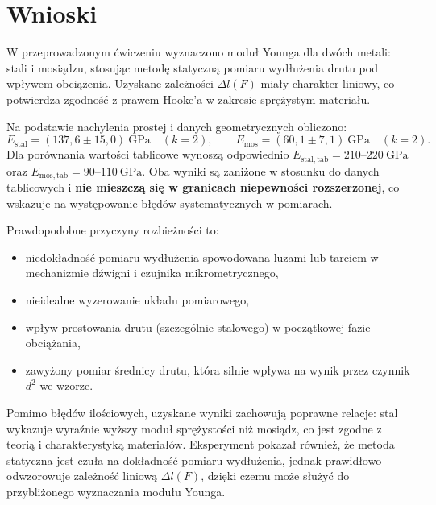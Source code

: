 \documentclass{fizykalab}
\begin{document}
\pagebreak
\section{Wnioski}

W przeprowadzonym ćwiczeniu wyznaczono moduł Younga dla dwóch metali:
stali i mosiądzu, stosując metodę statyczną pomiaru wydłużenia drutu
pod wpływem obciążenia. Uzyskane zależności \(\Delta l(F)\) miały
charakter liniowy, co potwierdza zgodność z prawem Hooke’a w zakresie
sprężystym materiału.

\bigskip
\noindent
Na podstawie nachylenia prostej i danych geometrycznych obliczono:
\[
  E_{\mathrm{stal}} = (137{,}6 \pm 15{,}0)\ \mathrm{GPa}\quad(k=2),
  \qquad
  E_{\mathrm{mos}} = (60{,}1 \pm 7{,}1)\ \mathrm{GPa}\quad(k=2).
\]
Dla porównania wartości tablicowe wynoszą odpowiednio
\(E_{\mathrm{stal,tab}} = 210\text{--}220\ \mathrm{GPa}\) oraz
\(E_{\mathrm{mos,tab}} = 90\text{--}110\ \mathrm{GPa}\).
Oba wyniki są zaniżone w stosunku do danych tablicowych i
\textbf{nie mieszczą się w granicach niepewności rozszerzonej},
co wskazuje na występowanie błędów systematycznych w pomiarach.

\bigskip
\noindent
Prawdopodobne przyczyny rozbieżności to:
\begin{itemize}
  \item niedokładność pomiaru wydłużenia spowodowana luzami lub tarciem
    w mechanizmie dźwigni i czujnika mikrometrycznego,
  \item nieidealne wyzerowanie układu pomiarowego,
  \item wpływ prostowania drutu (szczególnie stalowego) w początkowej
    fazie obciążania,
  \item zawyżony pomiar średnicy drutu, która silnie wpływa na wynik
    przez czynnik \(d^2\) we wzorze.
\end{itemize}

\bigskip
\noindent
Pomimo błędów ilościowych, uzyskane wyniki zachowują poprawne relacje:
stal wykazuje wyraźnie wyższy moduł sprężystości niż mosiądz,
co jest zgodne z teorią i charakterystyką materiałów.
Eksperyment pokazał również, że metoda statyczna jest czuła na
dokładność pomiaru wydłużenia, jednak prawidłowo odwzorowuje
zależność liniową \(\Delta l(F)\), dzięki czemu może służyć do
przybliżonego wyznaczania modułu Younga.
\end{document}
